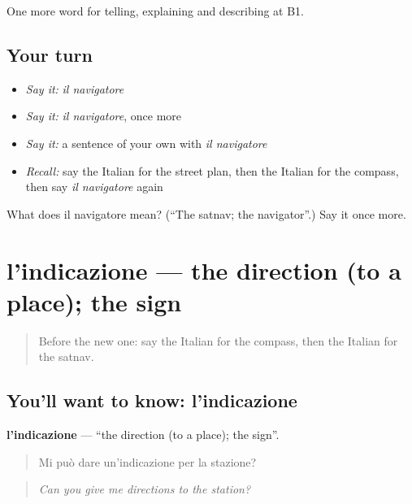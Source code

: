 \begin{grammarlens}[title={What you've built}]
One more word for telling, explaining and describing at B1.
\end{grammarlens}

\subsection*{Your turn}
\begin{itemize}
\raggedright
  \item \emph{Say it:} \emph{il navigatore}
  \item \emph{Say it:} \emph{il navigatore}, once more
  \item \emph{Say it:} a sentence of your own with \emph{il navigatore}
  \item \emph{Recall:} say the Italian for the street plan, then the Italian for the compass, then say \emph{il navigatore} again
\end{itemize}

\begin{tcolorbox}[breakable,colback=teal!4,colframe=teal!35!black,title={Before you move on}]
What does il navigatore mean? (\textquotedblleft{}The satnav; the navigator\textquotedblright{}.) Say it once more.
\end{tcolorbox}
\section[l'indicazione]{l'indicazione — the direction (to a place); the sign}

\label{lesson:IT-C440-indicazione}



\begin{quote}
Before the new one: say the Italian for the compass, then the Italian for the satnav.
\end{quote}

\subsection*{You'll want to know: l'indicazione}
\textbf{l'indicazione} — \textquotedblleft{}the direction (to a place); the sign\textquotedblright{}.

\begin{quote}
Mi può dare un'indicazione per la stazione?
\end{quote}

\begin{quote}
\emph{Can you give me directions to the station?}
\end{quote}


